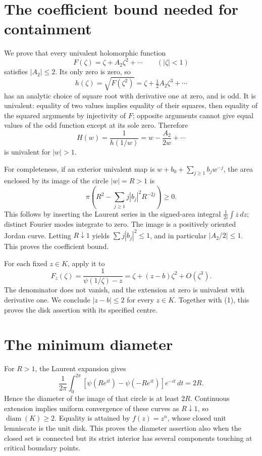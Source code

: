 \documentclass[11pt]{article}
\begin{document}
\section*{The coefficient bound needed for containment}
We prove that every univalent holomorphic function
\[
 F(\zeta)=\zeta+A_2\zeta^2+\cdots\qquad(|\zeta|<1)
\]
satisfies $|A_2|\le2$. Its only zero is zero, so
\[
 h(\zeta)=\sqrt{F(\zeta^2)}
 =\zeta+\tfrac12 A_2\zeta^3+\cdots
\]
has an analytic choice of square root with derivative one at zero, and is odd. It is univalent: equality of two values implies equality of their squares, then equality of the squared arguments by injectivity of $F$; opposite arguments cannot give equal values of the odd function except at its sole zero. Therefore
\[
 H(w)=\frac1{h(1/w)}=w-\frac{A_2}{2w}+\cdots
\]
is univalent for $|w|>1$.

For completeness, if an exterior univalent map is $w+b_0+\sum_{j\ge1}b_jw^{-j}$, the area enclosed by its image of the circle $|w|=R>1$ is
\[
 \pi\left(R^2-\sum_{j\ge1}j|b_j|^2R^{-2j}\right)\ge0.
\]
This follows by inserting the Laurent series in the signed-area integral $\frac1{2i}\int\overline z\,dz$; distinct Fourier modes integrate to zero. The image is a positively oriented Jordan curve. Letting $R\downarrow1$ yields $\sum j|b_j|^2\le1$, and in particular $|A_2/2|\le1$. This proves the coefficient bound.

For each fixed $z\in K$, apply it to
\[
 F_z(\zeta)=\frac1{\psi(1/\zeta)-z}
 =\zeta+(z-b)\zeta^2+O(\zeta^3).
\]
The denominator does not vanish, and the extension at zero is univalent with derivative one. We conclude $|z-b|\le2$ for every $z\in K$. Together with (1), this proves the disk assertion with its specified centre.

\section*{The minimum diameter}
For $R>1$, the Laurent expansion gives
\[
 \frac1{2\pi}\int_0^{2\pi}
 [\psi(Re^{it})-\psi(-Re^{it})]e^{-it}\,dt=2R.
\]
Hence the diameter of the image of that circle is at least $2R$. Continuous extension implies uniform convergence of these curves as $R\downarrow1$, so $\operatorname{diam}(K)\ge2$. Equality is attained by $f(z)=z^n$, whose closed unit lemniscate is the unit disk. This proves the diameter assertion also when the closed set is connected but its strict interior has several components touching at critical boundary points.
\end{document}
